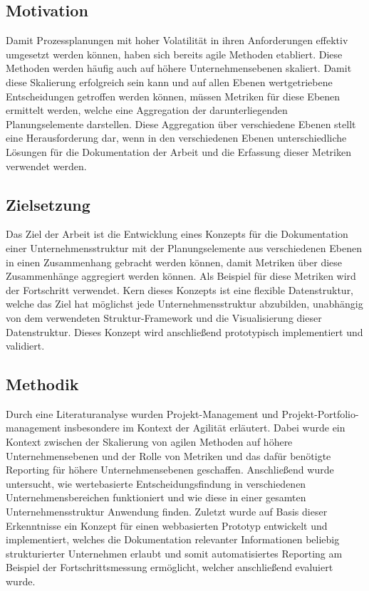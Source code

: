 \subsection{Motivation}
Damit Prozessplanungen mit hoher Volatilität in ihren Anforderungen effektiv umgesetzt werden können, haben sich bereits agile Methoden etabliert. Diese Methoden werden häufig auch auf höhere Unternehmensebenen skaliert. Damit diese Skalierung erfolgreich sein kann und auf allen Ebenen wertgetriebene Entscheidungen getroffen werden können, müssen Metriken für diese Ebenen ermittelt werden, welche eine Aggregation der darunterliegenden Planungselemente darstellen. Diese Aggregation über verschiedene Ebenen stellt eine Herausforderung dar, wenn in den verschiedenen Ebenen unterschiedliche Lösungen für die Dokumentation der Arbeit und die Erfassung dieser Metriken verwendet werden.

\subsection{Zielsetzung}
Das Ziel der Arbeit ist die Entwicklung eines Konzepts für die Dokumentation einer Unternehmensstruktur mit der Planungselemente aus verschiedenen Ebenen in einen Zusammenhang gebracht werden können, damit Metriken über diese Zusammenhänge aggregiert werden können. Als Beispiel für diese Metriken wird der Fortschritt verwendet. Kern dieses Konzepts ist eine flexible Datenstruktur, welche das Ziel hat möglichst jede Unternehmensstruktur abzubilden, unabhängig von dem verwendeten Struktur-Framework und die Visualisierung dieser Datenstruktur. Dieses Konzept wird anschließend prototypisch implementiert und validiert.

\subsection{Methodik}
Durch eine Literaturanalyse wurden Projekt-Management und Projekt-Portfolio-management insbesondere im Kontext der Agilität erläutert. Dabei wurde ein Kontext zwischen der Skalierung von agilen Methoden auf höhere Unternehmensebenen und der Rolle von Metriken und das dafür benötigte Reporting für höhere Unternehmensebenen geschaffen. Anschließend wurde untersucht, wie wertebasierte Entscheidungsfindung in verschiedenen Unternehmensbereichen funktioniert und wie diese in einer gesamten Unternehmensstruktur Anwendung finden. Zuletzt wurde auf Basis dieser Erkenntnisse ein Konzept für einen webbasierten Prototyp entwickelt und implementiert, welches die Dokumentation relevanter Informationen beliebig strukturierter Unternehmen erlaubt und somit automatisiertes Reporting am Beispiel der Fortschrittsmessung ermöglicht, welcher anschließend evaluiert wurde.

